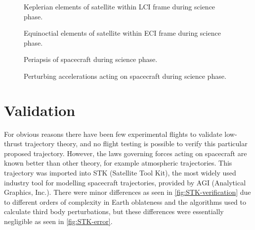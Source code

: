 \begin{figure}
\centering
\def\svgwidth{\figurewidth}

\caption{Keplerian elements of satellite within LCI frame during science phase.} \label{fig:Science-kep-lci}
\end{figure}

\begin{figure}
\centering
\def\svgwidth{\figurewidth}

\caption{Equinoctial elements of satellite within ECI frame during science phase.} \label{fig:Science-mee}
\end{figure}

\begin{figure}
\centering
\def\svgwidth{\figurewidth}

\caption{Periapsis of spacecraft during science phase.} \label{fig:Science-peri}
\end{figure}

\begin{figure}
\centering
\def\svgwidth{\figurewidth}

\caption{Perturbing accelerations acting on spacecraft during science phase.} \label{fig:Science-pert}
\end{figure}

%


\clearpage


\section{Validation} \label{sec:Validation}
For obvious reasons there have been few experimental flights to validate low-thrust trajectory theory, and no flight testing is possible to verify this particular proposed trajectory. However, the laws governing forces acting on spacecraft are known better than other theory, for example atmospheric trajectories. This trajectory was imported into STK (Satellite Tool Kit), the most widely used industry tool for modelling spacecraft trajectories, provided by AGI (Analytical Graphics, Inc.). There were minor differences as seen in \autoref{fig:STK-verification} due to different orders of complexity in Earth oblateness and the algorithms used to calculate third body perturbations, but these differences were essentially negligible as seen in \autoref{fig:STK-error}.

